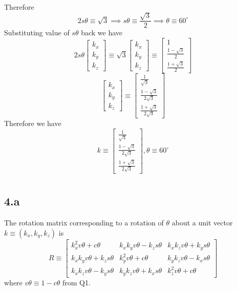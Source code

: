\documentclass[12pt]{article}
\begin{document}
Therefore
\[
  2s\theta \equiv \sqrt{3} \implies
  s\theta \equiv \frac{\sqrt{3}}{2} \implies
  \theta \equiv 60^\circ
\]
\[
\]
Substituting value of $s\theta$ back we have
\[
  2s\theta
  \begin{bmatrix}
    k_x\\
    k_y\\
    k_z
  \end{bmatrix}
  \equiv
  \sqrt{3}
  \begin{bmatrix}
    k_x\\
    k_y\\
    k_z
  \end{bmatrix}
  \equiv
  \begin{bmatrix} 1 \\ \frac{1 - \sqrt{3}}{2} \\ \frac{1 + \sqrt{3}}{2} \end{bmatrix}
\]
\[
  \begin{bmatrix}
    k_x\\
    k_y\\
    k_z
  \end{bmatrix}
  \equiv
  \begin{bmatrix} \frac{1}{\sqrt{3}} \\ \frac{1 - \sqrt{3}}{2\sqrt{3}} \\ \frac{1 + \sqrt{3}}{2\sqrt{3}} \end{bmatrix}
\]
Therefore we have
\[
  k \equiv
  \begin{bmatrix} \frac{1}{\sqrt{3}} \\ \frac{1 - \sqrt{3}}{2\sqrt{3}} \\ \frac{1 + \sqrt{3}}{2\sqrt{3}} \end{bmatrix},
  \theta \equiv 60^\circ
\]
\pagebreak

\section{}
\pagebreak

\section{}
\subsection*{4.a}
The rotation matrix corresponding to a rotation of $\theta$ about a unit vector $ k \equiv (k_x, k_y, k_z)$ is
\[
  R \equiv
  \begin{bmatrix}
    k_x^2v\theta + c\theta & k_xk_yv\theta - k_zs\theta & k_xk_zv\theta + k_ys\theta\\
    k_xk_yv\theta + k_zs\theta & k_y^2v\theta + c\theta & k_yk_zv\theta - k_xs\theta \\
    k_xk_zv\theta - k_ys\theta & k_yk_zv\theta + k_xs\theta & k_z^2v\theta + c\theta
  \end{bmatrix}
\]
where $v\theta \equiv 1 - c\theta$ from Q1.
\end{document}
